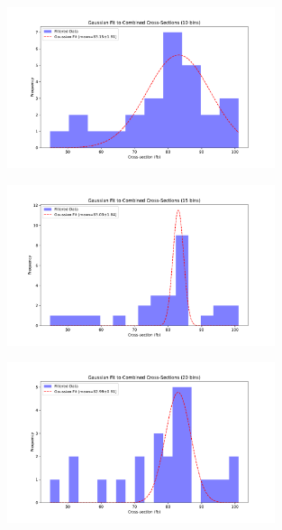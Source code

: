 \documentclass[a4paper,11pt]{article}
\begin{document}
\begin{figure}
	\centering
    \includegraphics[width=0.7\textwidth]{combined_cross_sections_fit(10 bins)(123).pdf}
\end{figure}
\begin{figure}
	\centering
    \includegraphics[width=0.7\textwidth]{combined_cross_sections_fit(15 bins)(123).pdf}
\end{figure}
\begin{figure}
	\centering
    \includegraphics[width=0.7\textwidth]{combined_cross_sections_fit(20 bins)(123).pdf}
\end{figure}
\end{document}
